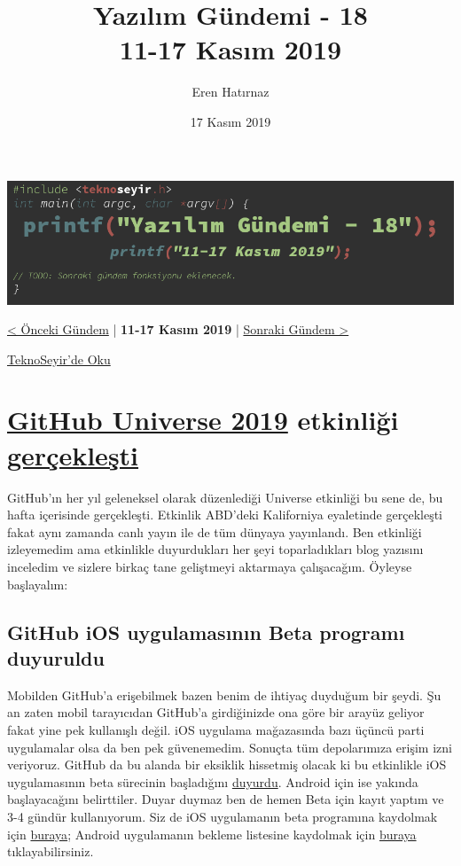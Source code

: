 \documentclass[11pt]{article}
\author{Eren Hatırnaz}
\date{17 Kasım 2019}
\title{Yazılım Gündemi - 18\\\medskip
\large 11-17 Kasım 2019}
\begin{document}
\maketitle
\tableofcontents \clearpage\shorthandoff{=}

\begin{center}
\includegraphics[width=.9\linewidth]{gorseller/yazilim-gundemi-banner.png}
\end{center}

\begin{center}
\href{../17/yazilim-gundemi-17.pdf}{< Önceki Gündem} | \textbf{11-17 Kasım 2019} | \href{../19/yazilim-gundemi-19.pdf}{Sonraki Gündem >}

\href{https://teknoseyir.com/blog/yazilim-gundemi-18-11-17-kasim-2019}{TeknoSeyir'de Oku}
\end{center}

\section{\href{https://githubuniverse.com/}{GitHub Universe 2019} etkinliği \href{https://github.blog/2019-11-13-universe-day-one/}{gerçekleşti}}
\label{sec:org656229e}
GitHub'ın her yıl geleneksel olarak düzenlediği Universe etkinliği bu sene de,
bu hafta içerisinde gerçekleşti. Etkinlik ABD'deki Kaliforniya eyaletinde
gerçekleşti fakat aynı zamanda canlı yayın ile de tüm dünyaya yayınlandı. Ben
etkinliği izleyemedim ama etkinlikle duyurdukları her şeyi toparladıkları blog
yazısını inceledim ve sizlere birkaç tane geliştmeyi aktarmaya çalışacağım.
Öyleyse başlayalım:

\subsection{GitHub iOS uygulamasının Beta programı duyuruldu}
\label{sec:org6a2716d}
Mobilden GitHub'a erişebilmek bazen benim de ihtiyaç duyduğum bir şeydi. Şu an
zaten mobil tarayıcıdan GitHub'a girdiğinizde ona göre bir arayüz geliyor
fakat yine pek kullanışlı değil. iOS uygulama mağazasında bazı üçüncü parti
uygulamalar olsa da ben pek güvenemedim. Sonuçta tüm depolarımıza erişim izni
veriyoruz. GitHub da bu alanda bir eksiklik hissetmiş olacak ki bu etkinlikle
iOS uygulamasının beta sürecinin başladığını \href{https://twitter.com/github/status/1194675248047616000}{duyurdu}. Android için ise yakında
başlayacağını belirttiler. Duyar duymaz ben de hemen Beta için kayıt yaptım ve
3-4 gündür kullanıyorum. Siz de iOS uygulamanın beta programına kaydolmak için
\href{https://github.com/mobile/beta?platforms=ios}{buraya}; Android uygulamanın bekleme listesine kaydolmak için \href{https://github.com/mobile/beta?platforms=android}{buraya}
tıklayabilirsiniz.
\end{document}
